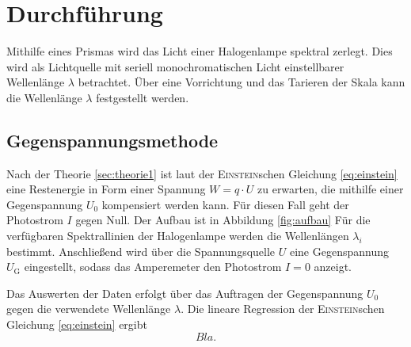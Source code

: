 \section{Durchf\"uhrung}
\label{sec:Durchfuehrung}
Mithilfe eines Prismas wird das Licht einer Halogenlampe spektral zerlegt.
Dies wird als Lichtquelle mit seriell monochromatischen Licht einstellbarer Wellenlänge $\lambda$ betrachtet.
Über eine Vorrichtung und das Tarieren der Skala kann die Wellenlänge $\lambda$ festgestellt werden.
\subsection{Gegenspannungsmethode}
Nach der Theorie \ref{sec:theorie1} ist laut der \textsc{Einstein}schen Gleichung \eqref{eq:einstein} eine Restenergie in Form einer Spannung $W = q\cdot U$ zu erwarten, die mithilfe einer Gegenspannung $U_0$ kompensiert werden kann. 
Für diesen Fall geht der Photostrom $I$ gegen Null.
Der Aufbau ist in Abbildung \ref{fig:aufbau}
Für die verfügbaren Spektrallinien der Halogenlampe werden die Wellenlängen $\lambda_i$ bestimmt. 
Anschließend wird über die Spannungsquelle $U$ eine Gegenspannung $U_\text{G}$ eingestellt, sodass das Amperemeter den Photostrom $I=0$ anzeigt.

Das Auswerten der Daten erfolgt über das Auftragen der Gegenspannung $U_0$ gegen die verwendete Wellenlänge $\lambda$.
Die lineare Regression der \textsc{Einstein}schen Gleichung \eqref{eq:einstein} ergibt
\begin{equation}
	Bla.
\end{equation}
